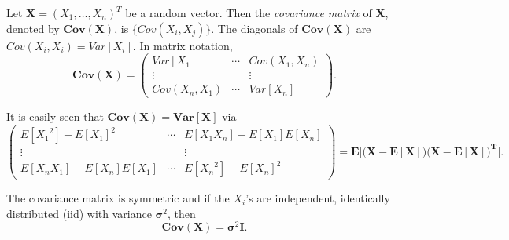 \documentclass[12pt]{article}
\begin{document}
Let $\mathbf{X}=(X_1,\ldots,X_n)^T$ be a random vector.  Then the \emph{covariance matrix} of $\mathbf{X}$, denoted by $\mathbf{Cov(X)}$, is $\lbrace Cov(X_i,X_j) \rbrace$.  The diagonals of $\mathbf{Cov(X)}$ are $Cov(X_i,X_i)=Var[X_i]$.  In matrix notation, 
$$\mathbf{Cov(X)}=\begin{pmatrix} Var[X_1] & \cdots & Cov(X_1,X_n) \\
\vdots & & \vdots \\ Cov(X_n,X_1) & \cdots & Var[X_n] \end{pmatrix}.$$

It is easily seen that $\mathbf{Cov(X)}=\mathbf{Var[X]}$ via
$$\begin{pmatrix} E[{X_1}^2]-E[X_1]^2 & \cdots & E[X_1X_n]-E[X_1]E[X_n] \\
\vdots & & \vdots \\ E[X_nX_1]-E[X_n]E[X_1] & \cdots & E[{X_n}^2]-E[X_n]^2 \end{pmatrix} = \mathbf{E\Big[\big(X-E[X]\big)\big(X-E[X]\big)^T\Big]}.$$

The covariance matrix is symmetric and if the $X_i$'s are independent, identically distributed (iid) with variance $\boldsymbol{\sigma}^2$, then 
$$\mathbf{Cov(X)}=\boldsymbol{\sigma}^2\mathbf{I}.$$
\end{document}
